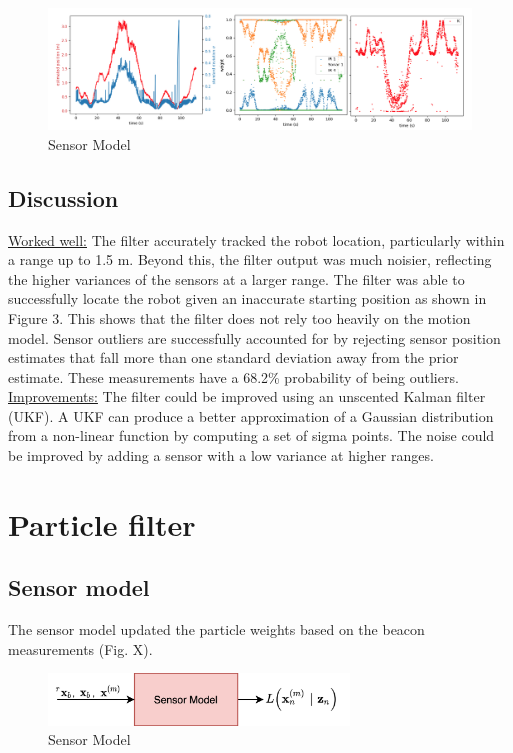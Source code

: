 \documentclass[a4paper,12pt]{article}
\begin{document}
\begin{figure}[h]
\includegraphics[width=16cm]{results2}
\centering
\caption{Sensor Model}
\end{figure}

\subsection{Discussion}
\underline{Worked well:} The filter accurately tracked the robot location, particularly within a range up to 1.5 m. Beyond this, the filter output was much noisier, reflecting the higher variances of the sensors at a larger range. The filter was able to successfully locate the robot given an inaccurate starting position as shown in Figure 3. This shows that the filter does not rely too heavily on the motion model. Sensor outliers are successfully accounted for by rejecting sensor position estimates that fall more than one standard deviation away from the prior estimate. These measurements have a 68.2\% probability of being outliers.
\\
\underline{Improvements:} The filter could be improved using an unscented Kalman filter (UKF). A UKF can produce a better approximation of a Gaussian distribution from a non-linear function by computing a set of sigma points. The noise could be improved by adding a sensor with a low variance at higher ranges. 



\section{Particle filter}

\subsection{Sensor model}

The sensor model updated the particle weights based on the beacon measurements (Fig. X).

\begin{figure}[h]
\includegraphics[width=8cm]{PartBSensor}
\centering
\caption{Sensor Model}
\end{figure}
\end{document}
